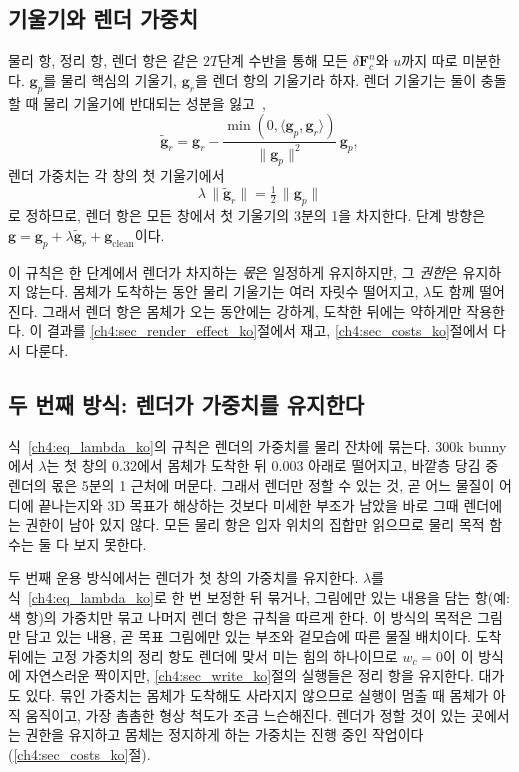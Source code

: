 \subsection{기울기와 렌더 가중치}
\label{ch4:sec_lambda_ko}
물리 항, 정리 항, 렌더 항은 같은 $2T$단계 수반을 통해 모든 $\delta\mathbf{F}^n_{c}$와 $u$까지 따로 미분한다.
$\mathbf{g}_p$를 물리 핵심의 기울기, $\mathbf{g}_r$을 렌더 항의 기울기라 하자. 렌더 기울기는 둘이 충돌할 때 물리 기울기에
반대되는 성분을 잃고~\citep{yu2020pcgrad},
\begin{equation}
\tilde{\mathbf{g}}_r=\mathbf{g}_r-\frac{\min(0,\langle\mathbf{g}_p,\mathbf{g}_r\rangle)}{\lVert\mathbf{g}_p\rVert^{2}}\,\mathbf{g}_p ,
\end{equation}
렌더 가중치는 각 창의 첫 기울기에서
\begin{equation}
\label{ch4:eq_lambda_ko}
\lambda\,\lVert\tilde{\mathbf{g}}_r\rVert=\tfrac12\,\lVert\mathbf{g}_p\rVert
\end{equation}
로 정하므로, 렌더 항은 모든 창에서 첫 기울기의 3분의 1을 차지한다. 단계 방향은
$\mathbf{g}=\mathbf{g}_p+\lambda\tilde{\mathbf{g}}_r+\mathbf{g}_{\mathrm{clean}}$이다.

이 규칙은 한 단계에서 렌더가 차지하는 \emph{몫}은 일정하게 유지하지만, 그 \emph{권한}은 유지하지 않는다. 몸체가 도착하는
동안 물리 기울기는 여러 자릿수 떨어지고, $\lambda$도 함께 떨어진다. 그래서 렌더 항은 몸체가 오는 동안에는 강하게, 도착한
뒤에는 약하게만 작용한다. 이 결과를 \ref{ch4:sec_render_effect_ko}절에서 재고, \ref{ch4:sec_costs_ko}절에서 다시 다룬다.

\subsection{두 번째 방식: 렌더가 가중치를 유지한다}
\label{ch4:sec_held_ko}
식~\eqref{ch4:eq_lambda_ko}의 규칙은 렌더의 가중치를 물리 잔차에 묶는다. 300k bunny에서 $\lambda$는 첫 창의 0.32에서 몸체가
도착한 뒤 0.003 아래로 떨어지고, 바깥층 당김 중 렌더의 몫은 5분의 1 근처에 머문다. 그래서 렌더만 정할 수 있는 것, 곧 어느
물질이 어디에 끝나는지와 3D 목표가 해상하는 것보다 미세한 부조가 남았을 바로 그때 렌더에는 권한이 남아 있지 않다. 모든
물리 항은 입자 위치의 집합만 읽으므로 물리 목적 함수는 둘 다 보지 못한다.

두 번째 운용 방식에서는 렌더가 첫 창의 가중치를 유지한다. $\lambda$를 식~\eqref{ch4:eq_lambda_ko}로 한 번 보정한 뒤 묶거나,
그림에만 있는 내용을 담는 항(예: 색 항)의 가중치만 묶고 나머지 렌더 항은 규칙을 따르게 한다. 이 방식의 목적은 그림만 담고
있는 내용, 곧 목표 그림에만 있는 부조와 겉모습에 따른 물질 배치이다. 도착 뒤에는 고정 가중치의 정리 항도 렌더에 맞서 미는
힘의 하나이므로 $w_c=0$이 이 방식에 자연스러운 짝이지만, \ref{ch4:sec_write_ko}절의 실행들은 정리 항을 유지한다. 대가도
있다. 묶인 가중치는 몸체가 도착해도 사라지지 않으므로 실행이 멈출 때 몸체가 아직 움직이고, 가장 촘촘한 형상 척도가 조금
느슨해진다. 렌더가 정할 것이 있는 곳에서는 권한을 유지하고 몸체는 정지하게 하는 가중치는 진행 중인 작업이다
(\ref{ch4:sec_costs_ko}절).

